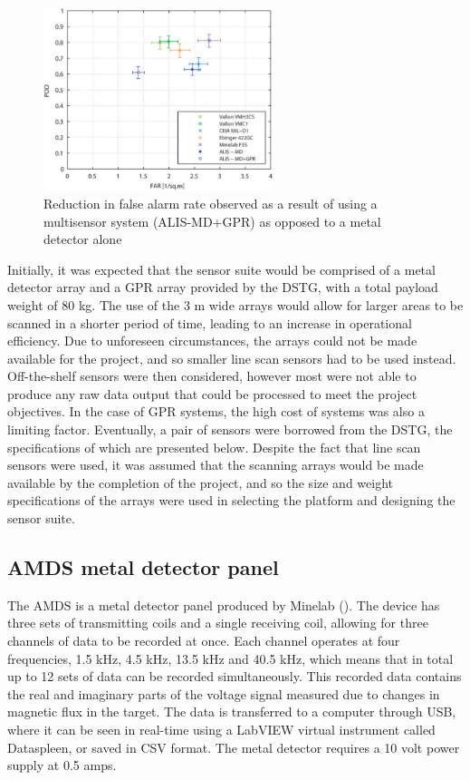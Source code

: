 \documentclass[main.tex]{subfiles}
\begin{document}
\begin{figure}[ht]
\includegraphics[width=0.6\textwidth]{3-ConceptDesign/FAR.PNG}
\centering
\caption[Reduction in false alarm rate as a result of using a multisensor system]{Reduction in false alarm rate observed as a result of using a multisensor system (ALIS-MD+GPR) as opposed to a metal detector alone \parencite{Takahashi10}} 
\end{figure}

Initially, it was expected that the sensor suite would be comprised of a metal detector array and a GPR array provided by the DSTG, with a total payload weight of 80 kg. The use of the 3 m wide arrays would allow for larger areas to be scanned in a shorter period of time, leading to an increase in operational efficiency. Due to unforeseen circumstances, the arrays could not be made available for the project, and so smaller line scan sensors had to be used instead. Off-the-shelf sensors were then considered, however most were not able to produce any raw data output that could be processed to meet the project objectives. In the case of GPR systems, the high cost of systems was also a limiting factor. Eventually, a pair of sensors were borrowed from the DSTG, the specifications of which are presented below. Despite the fact that line scan sensors were used, it was assumed that the scanning arrays would be made available by the completion of the project, and so the size and weight specifications of the arrays were used in selecting the platform and designing the sensor suite. 

\subsection{AMDS metal detector panel}
The AMDS is a metal detector panel produced by Minelab (). The device has three sets of transmitting coils and a single receiving coil, allowing for three channels of data to be recorded at once. Each channel operates at four frequencies, 1.5 kHz, 4.5 kHz, 13.5 kHz and 40.5 kHz, which means that in total up to 12 sets of data can be recorded simultaneously. This recorded data contains the real and imaginary parts of the voltage signal measured due to changes in magnetic flux in the target. The data is transferred to a computer through USB, where it can be seen in real-time using a LabVIEW virtual instrument called Dataspleen, or saved in CSV format. The metal detector requires a 10 volt power supply at 0.5 amps.  
\end{document}
